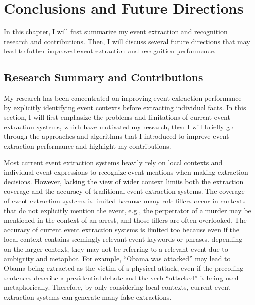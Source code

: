 \chapter{Conclusions and Future Directions}
\label{Chapter:ConclusionsAndFutureDirections}
In this chapter, I will first summarize my event extraction and recognition research 
and contributions. Then, I will discuss several future directions that may lead to 
futher improved event extraction and recognition performance. 

\section{Research Summary and Contributions}

My research has been concentrated on improving 
event extraction performance by 
explicitly identifying 
event contexts 
before 
extracting individual facts. 
In this section, 
I will first emphasize the problems and limitations of current 
event extraction systems, which have motivated my research, 
then I will briefly go through the approaches and algorithms that 
I introduced to improve event extraction performance 
and highlight my contributions. 

Most current event extraction systems 
heavily rely on local contexts
 and individual event expressions 
 to recognize event mentions 
when making extraction decisions. 
However, lacking the view of wider context limits both 
the extraction coverage and the accuracy of traditional event extraction systems. 
The coverage of event extraction systems is limited 
because many role fillers occur in contexts
that do not explicitly mention the event, 
e.g., the perpetrator
of a murder may be mentioned in the context
of an arrest, and those
fillers are often overlooked. 
The accuracy of current event extraction systems 
is limited too because 
even if the local context 
contains seemingly relevant event keywords or phrases. 
depending on the larger context, they may not be 
referring to a relevant event due to ambiguity and metaphor. 
For example, ``Obama was attacked'' may lead to
Obama being extracted as the victim of a physical attack,
even if the preceding sentences describe a presidential debate
and the verb ``attacked'' is being used metaphorically.
Therefore, by only considering local contexts, 
current event extraction systems can generate many false extractions.


